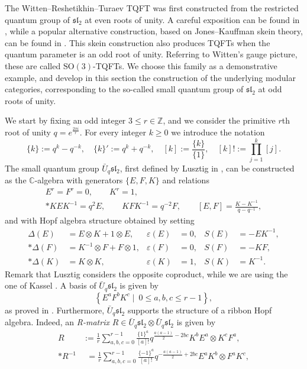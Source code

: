 \documentclass[a4paper,reqno]{amsart}
\theoremstyle{definition}
\theoremstyle{remark}
\newcommand{\Z}{\mathbb{Z}}
\newcommand{\C}{\mathbb{C}}
\newcommand{\leqs}{\leqslant}
\newcommand{\geqs}{\geqslant}
\newcommand{\fsl}{\mathfrak{sl}}
\newcommand{\SO}{\mathrm{SO}}
\begin{document}
The Witten--Reshetikhin--Turaev TQFT was first constructed from the restricted quantum group of $\fsl_2$ at even roots of unity. A careful exposition can be found in \cite{T94}, while a popular alternative construction, based on Jones--Kauffman skein theory, can be found in \cite{BHMV95}. This skein construction also produces TQFTs when the quantum parameter is an odd root of unity. Referring to Witten's gauge picture, these are called $\SO(3)$-TQFTs. We choose this family as a demonstrative example, and develop in this section the construction of the underlying modular categories, corresponding to the so-called small quantum group of $\fsl_2$ at odd roots of unity.

We start by fixing an odd integer $3 \leqs r \in \Z$, and we consider the primitive $r$th root of unity $q = e^{\frac{2 \pi i}{r}}$. For every integer $k \geqs 0$ we introduce the notation 
\[
 \{ k \} := q^k - q^{-k},
 \quad \{ k \}' := q^k + q^{-k},
 \quad [k] := \frac{\{ k \}}{\{ 1 \}},
 \quad [k]! := \prod_{j=1}^k [j].
\]
The small quantum group $\bar{U}_q \fsl_2$, first defined by Lusztig in \cite{Lu90}, can be constructed as the $\C$-algebra with generators $\{ E,F,K \}$ and relations
\begin{gather*}
 E^r = F^r = 0, \qquad K^r = 1, \\*
 K E K^{-1} = q^2 E, \qquad K F K^{-1} = q^{-2} F, \qquad [E,F] = \frac{K - K^{-1}}{q-q^{-1}},
\end{gather*}
and with Hopf algebra structure obtained by setting
\begin{align*}
 \Delta(E) &= E \otimes K + 1 \otimes E, & \varepsilon(E) &= 0, & S(E) &= -E K^{-1}, \\*
 \Delta(F) &= K^{-1} \otimes F + F \otimes 1, & \varepsilon(F) &= 0, & S(F) &= - K F, \\*
 \Delta(K) &= K \otimes K, & \varepsilon(K) &= 1, & S(K) &= K^{-1}.
\end{align*}
Remark that Lusztig considers the opposite coproduct, while we are using the one of Kassel \cite[Sec.~VII.1]{K95}. A basis of $\bar{U}_q \fsl_2$ is given by
\[
 \left\{ E^a F^b K^c \mid \ 0 \leqs a,b,c \leqs r - 1 \right\},
\]
as proved in \cite[Thm.~5.6]{Lu90}. Furthermore, $\bar{U}_q \fsl_2$ supports the structure of a ribbon Hopf algebra. Indeed, an \textit{R-matrix} $R \in \bar{U}_q \fsl_2 \otimes \bar{U}_q \fsl_2$ is given by
\begin{align*}
 R &:= \frac{1}{r} \sum_{a,b,c=0}^{r-1} \frac{\{ 1 \}^a}{[a]!}
 q^{\frac{a(a-1)}{2} - 2bc} K^b E^a \otimes K^c F^a, \\*
 R^{-1} &\phantom{:}= \frac{1}{r} \sum_{a,b,c=0}^{r-1} \frac{\{ -1 \}^a}{[a]!}
 q^{-\frac{a(a-1)}{2} + 2bc} E^a K^b \otimes F^a K^c,
\end{align*}
\end{document}

